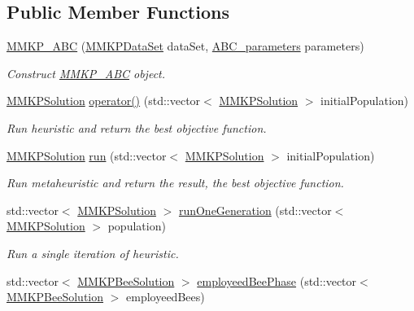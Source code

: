 \subsection*{Public Member Functions}
\begin{DoxyCompactItemize}
\item 
\hyperlink{class_m_m_k_p___a_b_c_a4dabcc8155d17c5ddc984dfd1307b4d0}{M\+M\+K\+P\+\_\+\+A\+B\+C} (\hyperlink{class_m_m_k_p_data_set}{M\+M\+K\+P\+Data\+Set} data\+Set, \hyperlink{class_a_b_c__parameters}{A\+B\+C\+\_\+parameters} parameters)
\begin{DoxyCompactList}\small\item\em Construct \hyperlink{class_m_m_k_p___a_b_c}{M\+M\+K\+P\+\_\+\+A\+B\+C} object. \end{DoxyCompactList}\item 
\hyperlink{class_m_m_k_p_solution}{M\+M\+K\+P\+Solution} \hyperlink{class_m_m_k_p___a_b_c_ad7777f81bbb05359ea884d7cd57df0f7}{operator()} (std\+::vector$<$ \hyperlink{class_m_m_k_p_solution}{M\+M\+K\+P\+Solution} $>$ initial\+Population)
\begin{DoxyCompactList}\small\item\em Run heuristic and return the best objective function. \end{DoxyCompactList}\item 
\hypertarget{class_m_m_k_p___a_b_c_afb60fe316bf761a5cc2a068fab9a15d1}{\hyperlink{class_m_m_k_p_solution}{M\+M\+K\+P\+Solution} \hyperlink{class_m_m_k_p___a_b_c_afb60fe316bf761a5cc2a068fab9a15d1}{run} (std\+::vector$<$ \hyperlink{class_m_m_k_p_solution}{M\+M\+K\+P\+Solution} $>$ initial\+Population)}\label{class_m_m_k_p___a_b_c_afb60fe316bf761a5cc2a068fab9a15d1}

\begin{DoxyCompactList}\small\item\em Run metaheuristic and return the result, the best objective function. \end{DoxyCompactList}\item 
\hypertarget{class_m_m_k_p___a_b_c_a3f405cbe0f90959d1f55bea4211476d4}{std\+::vector$<$ \hyperlink{class_m_m_k_p_solution}{M\+M\+K\+P\+Solution} $>$ \hyperlink{class_m_m_k_p___a_b_c_a3f405cbe0f90959d1f55bea4211476d4}{run\+One\+Generation} (std\+::vector$<$ \hyperlink{class_m_m_k_p_solution}{M\+M\+K\+P\+Solution} $>$ population)}\label{class_m_m_k_p___a_b_c_a3f405cbe0f90959d1f55bea4211476d4}

\begin{DoxyCompactList}\small\item\em Run a single iteration of heuristic. \end{DoxyCompactList}\item 
\hypertarget{class_m_m_k_p___a_b_c_af4c67bc91937841cb32510de2e10ba84}{std\+::vector$<$ \hyperlink{struct_m_m_k_p_bee_solution}{M\+M\+K\+P\+Bee\+Solution} $>$ \hyperlink{class_m_m_k_p___a_b_c_af4c67bc91937841cb32510de2e10ba84}{employeed\+Bee\+Phase} (std\+::vector$<$ \hyperlink{struct_m_m_k_p_bee_solution}{M\+M\+K\+P\+Bee\+Solution} $>$ employeed\+Bees)}\label{class_m_m_k_p___a_b_c_af4c67bc91937841cb32510de2e10ba84}


\end{DoxyCompactItemize}
